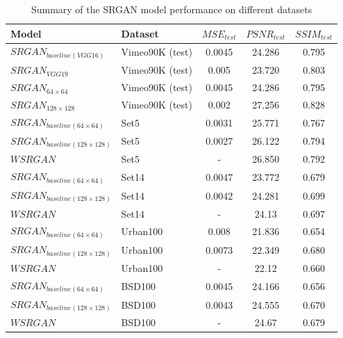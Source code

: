\documentclass[conference]{IEEEtran}
\begin{document}
\begin{table}[htb]
	\centering
	\caption{Summary of the SRGAN model performance on different datasets}
	\label{tab:models_metrics_summary}
	\begin{tabular}{|l|l|c|c|c|}
	\hline
	Model                               & Dataset         & $MSE_{test}$ & $PSNR_{test}$ & $SSIM_{test}$  \\ \hline
    $SRGAN_{baseline (VGG16)}$          & Vimeo90K (test) & 0.0045       & 24.286        & 0.795          \\ \hline
	$SRGAN_{VGG19}$                     & Vimeo90K (test) & 0.005        & 23.720        & 0.803          \\ \hline

	$SRGAN_{64 \times 64}$              & Vimeo90K (test) & 0.0045       & 24.286        & 0.795          \\ \hline
	$SRGAN_{128 \times 128}$            & Vimeo90K (test) & 0.002        & 27.256        & 0.828          \\ \hline

	$SRGAN_{baseline (64 \times 64)}$   & Set5            & 0.0031       & 25.771        & 0.767          \\ \hline
	$SRGAN_{baseline (128 \times 128)}$ & Set5            & 0.0027       & 26.122        & 0.794          \\ \hline
	$WSRGAN$                            & Set5            & -            & 26.850        & 0.792          \\ \hline

    $SRGAN_{baseline (64 \times 64)}$   & Set14           & 0.0047       & 23.772        & 0.679          \\ \hline
	$SRGAN_{baseline (128 \times 128)}$ & Set14           & 0.0042       & 24.281        & 0.699          \\ \hline
	$WSRGAN$                            & Set14           & -            & 24.13         & 0.697          \\ \hline

	$SRGAN_{baseline (64 \times 64)}$   & Urban100        & 0.008        & 21.836        & 0.654          \\ \hline
	$SRGAN_{baseline (128 \times 128)}$ & Urban100        & 0.0073       & 22.349        & 0.680          \\ \hline
	$WSRGAN$                            & Urban100        & -            & 22.12         & 0.660          \\ \hline

	$SRGAN_{baseline (64 \times 64)}$   & BSD100          & 0.0045       & 24.166        & 0.656          \\ \hline
	$SRGAN_{baseline (128 \times 128)}$ & BSD100          & 0.0043       & 24.555        & 0.670          \\ \hline
	$WSRGAN$                            & BSD100          & -            & 24.67         & 0.679          \\ \hline
\end{tabular}
\end{table}
\end{document}
